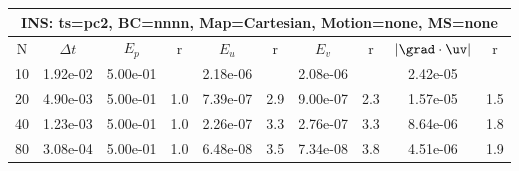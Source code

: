 
\begin{tabular}{|c|c|c|c|c|c|c|c|c|c|} \hline
 \multicolumn{10}{|c|}{INS: ts=pc2, BC=nnnn, Map=Cartesian, Motion=none, MS=none } \\ \hline 
     N  &   $\Delta t$ & $E_p$   &  r  &   $E_u$   &   r    &   $E_v$   & r   &  $|\grad\cdot\uv|$  & r   \\ \hline 
  10   &  1.92e-02  &   5.00e-01  &        &   2.18e-06  &        &   2.08e-06  &        &   2.42e-05  &        \\ 
  20   &  4.90e-03  &   5.00e-01  & 1.0  &   7.39e-07  & 2.9  &   9.00e-07  & 2.3  &   1.57e-05  & 1.5  \\ 
  40   &  1.23e-03  &   5.00e-01  & 1.0  &   2.26e-07  & 3.3  &   2.76e-07  & 3.3  &   8.64e-06  & 1.8  \\ 
  80   &  3.08e-04  &   5.00e-01  & 1.0  &   6.48e-08  & 3.5  &   7.34e-08  & 3.8  &   4.51e-06  & 1.9  \\ 
 \hline 
\end{tabular}
